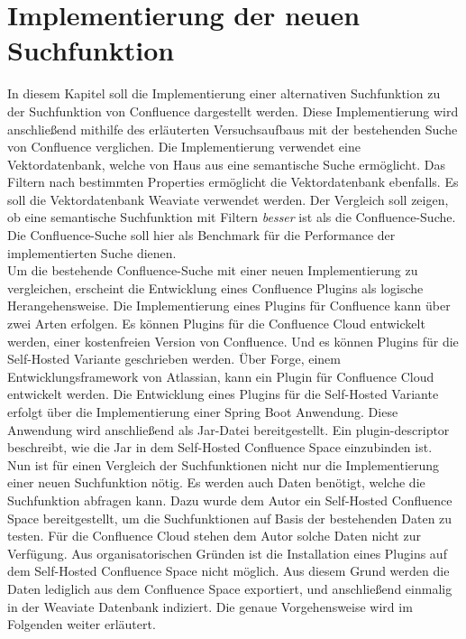 \chapter{Implementierung der neuen Suchfunktion}
In diesem Kapitel soll die Implementierung einer alternativen Suchfunktion zu der Suchfunktion von Confluence dargestellt werden.
Diese Implementierung wird anschließend mithilfe des erläuterten Versuchsaufbaus mit der bestehenden Suche von Confluence verglichen.
Die Implementierung verwendet eine Vektordatenbank, welche von Haus aus eine semantische Suche ermöglicht.
Das Filtern nach bestimmten Properties ermöglicht die Vektordatenbank ebenfalls.
Es soll die Vektordatenbank Weaviate verwendet werden.
Der Vergleich soll zeigen, ob eine semantische Suchfunktion mit Filtern \textit{besser} ist als die Confluence-Suche.
Die Confluence-Suche soll hier als Benchmark für die Performance der implementierten Suche dienen.\\

Um die bestehende Confluence-Suche mit einer neuen Implementierung zu vergleichen, erscheint die Entwicklung eines Confluence Plugins als logische Herangehensweise.
Die Implementierung eines Plugins für Confluence kann über zwei Arten erfolgen.
Es können Plugins für die Confluence Cloud entwickelt werden, einer kostenfreien Version von Confluence.
Und es können Plugins für die Self-Hosted Variante geschrieben werden.
Über Forge, einem Entwicklungsframework von Atlassian, kann ein Plugin für Confluence Cloud entwickelt werden.
Die Entwicklung eines Plugins für die Self-Hosted Variante erfolgt über die Implementierung einer Spring Boot Anwendung.
Diese Anwendung wird anschließend als Jar-Datei bereitgestellt.
Ein plugin-descriptor beschreibt, wie die Jar in dem Self-Hosted Confluence Space einzubinden ist.\\

Nun ist für einen Vergleich der Suchfunktionen nicht nur die Implementierung einer neuen Suchfunktion nötig.
Es werden auch Daten benötigt, welche die Suchfunktion abfragen kann.
Dazu wurde dem Autor ein Self-Hosted Confluence Space bereitgestellt, um die Suchfunktionen auf Basis der bestehenden Daten zu testen.
Für die Confluence Cloud stehen dem Autor solche Daten nicht zur Verfügung.
Aus organisatorischen Gründen ist die Installation eines Plugins auf dem Self-Hosted Confluence Space nicht möglich.
Aus diesem Grund werden die Daten lediglich aus dem Confluence Space exportiert, und anschließend einmalig in der Weaviate Datenbank indiziert.
Die genaue Vorgehensweise wird im Folgenden weiter erläutert.

